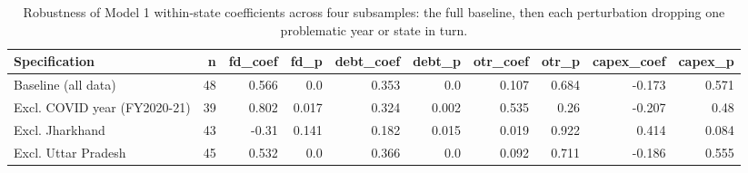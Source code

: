 \documentclass[12pt,a4paper]{article}
\begin{document}
\begin{table}[H]
\centering
\caption{Robustness of Model 1 within-state coefficients across four subsamples: the full baseline, then each perturbation dropping one problematic year or state in turn.}
\label{tab:23}
\footnotesize
\begin{adjustbox}{max width=\textwidth}
\begin{tabular}{@{}lrrrrrrrrr@{}}
\toprule
Specification & n & fd\_coef & fd\_p & debt\_coef & debt\_p & otr\_coef & otr\_p & capex\_coef & capex\_p \\
\midrule
Baseline (all data) & 48 & 0.566 & 0.0 & 0.353 & 0.0 & 0.107 & 0.684 & -0.173 & 0.571 \\
Excl. COVID year (FY2020-21) & 39 & 0.802 & 0.017 & 0.324 & 0.002 & 0.535 & 0.26 & -0.207 & 0.48 \\
Excl. Jharkhand & 43 & -0.31 & 0.141 & 0.182 & 0.015 & 0.019 & 0.922 & 0.414 & 0.084 \\
Excl. Uttar Pradesh & 45 & 0.532 & 0.0 & 0.366 & 0.0 & 0.092 & 0.711 & -0.186 & 0.555 \\
\bottomrule
\end{tabular}
\end{adjustbox}
\end{table}
\end{document}
